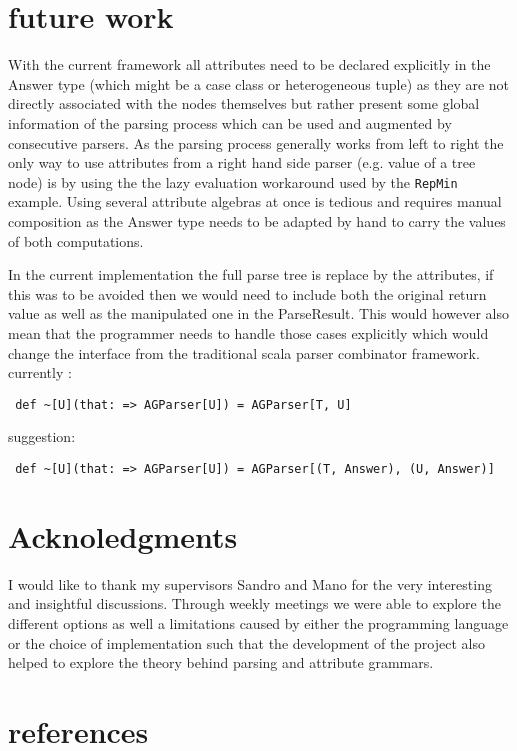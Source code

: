 \section{future work}
With the current framework all attributes need to be declared explicitly in the Answer type (which might be a case class or heterogeneous tuple) as they are not directly associated with the nodes themselves but rather present some global information of the parsing process which can be used and augmented by consecutive parsers.
As the parsing process generally works from left to right the only way to use attributes from a right hand side parser (e.g. value of a tree node) is by using the the lazy evaluation workaround used by the \verb/RepMin/ example.
Using several attribute algebras at once is tedious and requires manual composition as the Answer type needs to be adapted by hand to carry the values of both computations.

In the current implementation the full parse tree is replace by the attributes, if this was to be avoided then we would need to include both the original return value as well as the manipulated one in the ParseResult. This would however also mean that the programmer needs to handle those cases explicitly which would change the interface from the traditional scala parser combinator framework.
currently : \begin{verbatim} def ~[U](that: => AGParser[U]) = AGParser[T, U]\end{verbatim}
suggestion: \begin{verbatim} def ~[U](that: => AGParser[U]) = AGParser[(T, Answer), (U, Answer)]
\end{verbatim}

\section{Acknoledgments}
I would like to thank my supervisors Sandro and Mano for the very interesting and insightful discussions. Through weekly meetings we were able to explore the different options as well a limitations caused by either the programming language or the choice of implementation such that the development of the project also helped to explore the theory behind parsing and attribute grammars.

\section{references}

